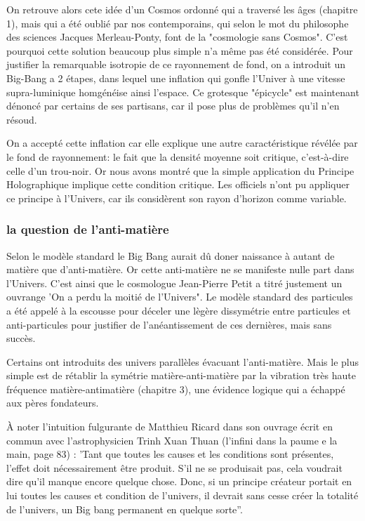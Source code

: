\documentclass[a4paper,12pt]{article}
\begin{document}
On retrouve alors cete idée d'un Cosmos ordonné qui a traversé les âges (chapitre 1), mais qui a été oublié par nos contemporains, qui selon le mot du philosophe des sciences Jacques Merleau-Ponty, font de la "cosmologie sans Cosmos". C'est pourquoi cette solution beaucoup plus simple n'a même pas été considérée. Pour justifier la remarquable isotropie de ce rayonnement de fond, on a introduit un Big-Bang a 2 étapes, dans lequel une inflation qui gonfle l'Univer à une vitesse supra-luminique homgénéise ainsi l'espace. Ce grotesque "épicycle" est maintenant dénoncé par certains de ses partisans, car il pose plus de problèmes qu'il n'en résoud.


On a accepté cette inflation car elle explique une autre caractéristique révélée par le fond de rayonnement: le fait que la densité moyenne soit critique, c'est-à-dire celle d'un trou-noir. Or nous avons montré que la simple application du Principe Holographique implique cette condition critique. Les officiels n'ont pu appliquer ce principe à l'Univers, car ils considèrent son rayon d'horizon comme variable.

\subsubsection{la question de l'anti-matière}
   Selon le modèle standard le Big Bang aurait dû doner naissance à autant de matière que d'anti-matière. Or cette anti-matière ne se manifeste nulle part dans l'Univers. C'est ainsi que le cosmologue Jean-Pierre Petit a titré justement un ouvrange 'On a perdu la moitié de l'Univers". Le modèle standard des particules a été appelé à la escousse pour déceler une lègère dissymétrie entre particules et anti-particules pour justifier de l'anéantissement de ces dernières, mais sans succès.
   
   
    Certains ont introduits des univers parallèles évacuant l'anti-matière. Mais le plus simple est de rétablir la symétrie matière-anti-matière par la vibration très haute fréquence matière-antimatière (chapitre 3), une évidence logique qui a échappé aux pères fondateurs. 
    
    
    À noter l'intuition fulgurante de Matthieu Ricard dans son ouvrage écrit en commun avec l'astrophysicien Trinh Xuan Thuan (l'infini dans la paume e la main, page 83) : 'Tant que toutes les causes et les conditions sont présentes, l'effet doit nécessairement être produit. S'il ne se produisait pas, cela voudrait dire qu'il manque encore quelque chose. Donc, si un principe créateur portait en lui toutes les causes et condition de l'univers, il devrait sans cesse créer la totalité de l'univers, un Big bang permanent en quelque sorte''. 
    
\end{document}
